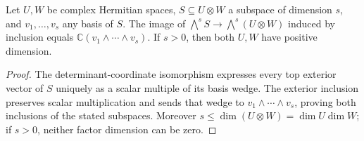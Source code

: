 \begin{lemma}
\label{lem:balanced-intrinsic-plucker-line}
\leanok
{}

Let $U,W$ be complex Hermitian spaces, $S\subseteq U\otimes W$ a subspace
of dimension $s$, and $v_1,\ldots,v_s$ any basis of $S$. The image of
$\bigwedge^s S\to\bigwedge^s(U\otimes W)$ induced by inclusion equals
$\mathbb C(v_1\wedge\cdots\wedge v_s)$. If $s>0$, then both $U,W$
have positive dimension.
\end{lemma}
\begin{proof}
The determinant-coordinate isomorphism expresses every top exterior
vector of $S$ uniquely as a scalar multiple of its basis wedge.
The exterior inclusion preserves scalar multiplication and sends that
wedge to $v_1\wedge\cdots\wedge v_s$, proving both inclusions of the
stated subspaces. Moreover $s\leq\dim(U\otimes W)=\dim U\dim W$;
if $s>0$, neither factor dimension can be zero.
\end{proof}

